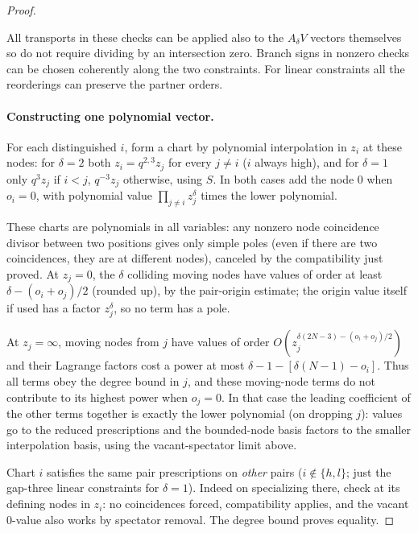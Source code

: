 \begin{proof}
\begin{itemize}
\end{itemize}
All transports in these checks can be applied also to the \(A_\delta V\) vectors themselves so do not require dividing by an intersection zero. Branch signs in nonzero checks can be chosen coherently along the two constraints. For linear constraints all the reorderings can preserve the partner orders.

\paragraph{Constructing one polynomial vector.}
For each distinguished \(i\), form a chart by polynomial interpolation in \(z_i\) at these nodes: for \(\delta=2\) both \(z_i=q^{2,3}z_j\) for every \(j\ne i\) (\(i\) always high), and for \(\delta=1\) only \(q^3z_j\) if \(i<j\), \(q^{-3}z_j\) otherwise, using \(S\). In both cases add the node 0 when \(o_i=0\), with polynomial value \(\prod_{j\ne i}z_j^\delta\) times the lower polynomial. 

These charts are polynomials in all variables: any nonzero node coincidence divisor between two positions gives only simple poles (even if there are two coincidences, they are at different nodes), canceled by the compatibility just proved. At \(z_j=0\), the \(\delta\) colliding moving nodes have values of order at least \(\delta-(o_i+o_j)/2\) (rounded up), by the pair-origin estimate; the origin value itself if used has a factor \(z_j^\delta\), so no term has a pole. 

At \(z_j=\infty\), moving nodes from \(j\) have values of order \(O(z_j^{\delta(2N-3)-(o_i+o_j)/2})\) and their Lagrange factors cost a power at most \(\delta-1-[\delta(N-1)-o_i]\). Thus all terms obey the degree bound in \(j\), and these moving-node terms do not contribute to its highest power when \(o_j=0\). In that case the leading coefficient of the other terms together is exactly the lower polynomial (on dropping \(j\)): values go to the reduced prescriptions and the bounded-node basis factors to the smaller interpolation basis, using the vacant-spectator limit above.

Chart \(i\) satisfies the same pair prescriptions on \emph{other} pairs (\(i\notin\{h,l\}\); just the gap-three linear constraints for \(\delta=1\)). Indeed on specializing there, check at its defining nodes in \(z_i\): no coincidences forced, compatibility applies, and the vacant 0-value also works by spectator removal. The degree bound proves equality. 


\end{proof}
